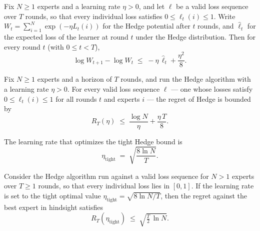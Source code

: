 \begin{lemma}
\label{log_potential_step_tight}
\leanok
{}
Fix $N \ge 1$ experts and a learning rate $\eta > 0$, and let $\ell$ be a valid loss
sequence over $T$ rounds, so that every individual loss satisfies $0 \le \ell_t(i) \le
1$. Write $W_t = \sum_{i=1}^{N} \exp(-\eta L_t(i))$ for the Hedge potential after $t$
rounds, and $\widehat{\ell}_t$ for the expected loss of the learner at round $t$ under
the Hedge distribution. Then for every round $t$ (with $0 \le t < T$),
\[
  \log W_{t+1} - \log W_t \;\le\; -\eta\,\widehat{\ell}_t + \frac{\eta^2}{8}.
\]
\end{lemma}

\begin{theorem}
\label{hedge_regret_bound_tight}
\leanok
{}
Fix $N \ge 1$ experts and a horizon of $T$ rounds, and run the Hedge algorithm with a
learning rate $\eta > 0$. For every valid loss sequence $\ell$ — one whose losses
satisfy $0 \le \ell_t(i) \le 1$ for all rounds $t$ and experts $i$ — the regret of Hedge
is bounded by
\[
  R_T(\eta) \;\le\; \frac{\log N}{\eta} + \frac{\eta\,T}{8}.
\]
\end{theorem}

\begin{definition}
\label{optimalEtaTight}
\leanok
The learning rate that optimizes the tight Hedge bound is
\[
  \eta_{\mathrm{tight}} \;=\; \sqrt{\frac{8\ln N}{T}}.
\]
\end{definition}

\begin{theorem}
\label{hedge_regret_tight_optimal}
\leanok
{}
Consider the Hedge algorithm run against a valid loss sequence for $N > 1$ experts over
$T \ge 1$ rounds, so that every individual loss lies in $[0,1]$. If the learning rate is
set to the tight optimal value $\eta_{\mathrm{tight}} = \sqrt{8\ln N / T}$, then the
regret against the best expert in hindsight satisfies
\[
  R_T(\eta_{\mathrm{tight}}) \;\le\; \sqrt{\tfrac{T}{2}\,\ln N}.
\]
\end{theorem}
